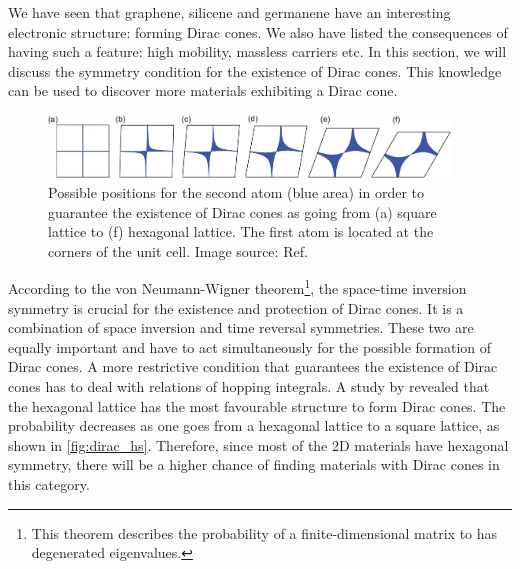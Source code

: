 We have seen that graphene, silicene and germanene have an interesting electronic structure: forming Dirac cones. We also have listed the consequences of having such a feature: high mobility, massless carriers etc. In this section, we will discuss the symmetry condition for the existence of Dirac cones. This knowledge can be used to discover more materials exhibiting a Dirac cone. 
\begin{figure}[htbp!] 
\centering  
\includegraphics[width=0.95\textwidth]{dirac_hs.png}
\caption[Possibility of the formation of Dirac cones in various lattice systems]{ Possible positions for the second atom (blue area) in order to guarantee the existence of Dirac cones as going from (a) square lattice to (f) hexagonal lattice. The first atom is located at the corners of the unit cell. Image source: Ref. \cite{Liu2013} }  
\label{fig:dirac_hs}
\end{figure} 
According to the von Neumann-Wigner theorem\footnote{This theorem describes the probability of a finite-dimensional matrix to has degenerated eigenvalues.}, the space-time inversion symmetry is crucial for the existence and protection of Dirac cones\cite{Wang2015b}. It is a combination of space inversion and time reversal symmetries. These two are equally important and have to act simultaneously for the possible formation of Dirac cones. A more restrictive condition that guarantees the existence of Dirac cones has to deal with relations of hopping integrals\cite{Hasegawa2006,Liu2013}. A study by \citet{Liu2013} revealed that the hexagonal lattice has the most favourable structure to form Dirac cones. The probability decreases as one goes from a hexagonal lattice to a square lattice, as shown in \autoref{fig:dirac_hs}. Therefore, since most of the 2D materials have hexagonal symmetry, there will be a higher chance of finding materials with Dirac cones in this category.

